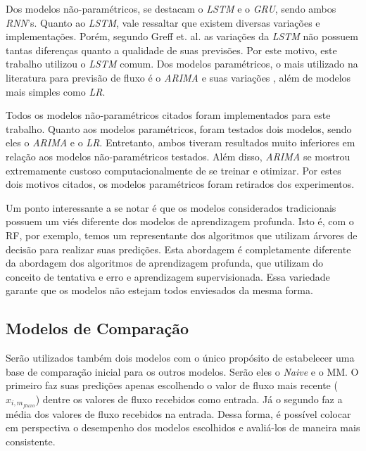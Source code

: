 Dos modelos não-paramétricos, se destacam o \textit{\acrfull{LSTM}} e o \textit{\acrfull{GRU}}, sendo ambos \textit{\acrshort{RNN}}'s. Quanto ao \textit{\acrfull{LSTM}}, vale ressaltar que existem diversas variações e implementações. Porém, segundo Greff et. al. \cite{Greff_2015} as variações da \textit{\acrshort{LSTM}} não possuem tantas diferenças quanto a qualidade de suas previsões. Por este motivo, este trabalho utilizou o \textit{\acrfull{LSTM}} comum. Dos modelos paramétricos, o mais utilizado na literatura para previsão de fluxo é o \textit{\acrfull{ARIMA}} e suas variações \cite{doi:10.1080/01441647.2014.992496}, além de modelos mais simples como \textit{\acrfull{LR}}. 

Todos os modelos não-paramétricos citados foram implementados para este trabalho. Quanto aos modelos paramétricos, foram testados dois modelos, sendo eles o \textit{\acrshort{ARIMA}} e o \textit{\acrshort{LR}}. Entretanto, ambos tiveram resultados muito inferiores em relação aos modelos não-paramétricos testados. Além disso, \textit{\acrshort{ARIMA}} se mostrou extremamente custoso computacionalmente de se treinar e otimizar. Por estes dois motivos citados, os modelos paramétricos foram retirados dos experimentos.

Um ponto interessante a se notar é que os modelos considerados tradicionais possuem um viés diferente dos modelos de aprendizagem profunda. Isto é, com o \acrshort{RF}, por exemplo, temos um representante dos algoritmos que utilizam árvores de decisão para realizar suas predições. Esta abordagem é completamente diferente da abordagem dos algoritmos de aprendizagem profunda, que utilizam do conceito de tentativa e erro e aprendizagem supervisionada. Essa variedade garante que os modelos não estejam todos enviesados da mesma forma.



\subsection{Modelos de Comparação}

Serão utilizados também dois modelos com o único propósito de estabelecer uma base de comparação inicial para os outros modelos. Serão eles o \textit{Naive} e o \acrfull{MM}. O primeiro faz suas predições apenas escolhendo o valor de fluxo mais recente (\(x_{i, m_{fluxo}}\)) dentre os valores de fluxo recebidos como entrada. Já o segundo faz a média dos valores de fluxo recebidos na entrada. Dessa forma, é possível colocar em perspectiva o desempenho dos modelos escolhidos e avaliá-los de maneira mais consistente.

